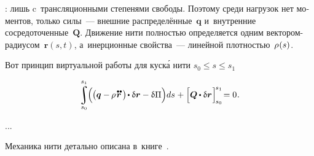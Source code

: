 \begin{otherlanguage}{russian}

 :
   лишь c~трансляционными степенями свободы.
Поэтому среди нагрузок нет моментов, только  силы~--- внешние распределённые~$\bm{q}$ и~внутренние сосредоточенные~$\bm{Q}$.
Движение нити полностью определяется одним вектором-радиусом~${\bm{r}(s,t)}$, а~инерционные свойства~--- линейной плотностью~${\rho\hspace{.12ex}(s)}$.

Вот принцип виртуальной работы для куск\'{а} нити ${s_0 \leq s \leq s_1}$

\nopagebreak\vspace{-0.25em}\begin{equation}
\scalebox{0.95}{$
\displaystyle \integral\displaylimits_{\raisemath{.05em}{\mathclap{s_0}}}^{\raisemath{.15em}{\mathclap{s_1}}}
$}
\hspace{-0.25ex} \Bigl( \hspace{-0.1ex}
\bigl( \bm{q} - \hspace{-0.12ex} \rho \hspace{.2ex} \mathdotdotabove{\bm{r}} \hspace{.36ex} \bigr)
\hspace{-0.25ex} \dotp \variation{\bm{r}}
- \variation{\Pi}
\Bigr) ds
\hspace{.1ex} + \Bigl[
\bm{Q} \hspace{-0.1ex} \dotp \variation{\bm{r}}
\hspace{.12ex} \Bigr]_{\hspace{-0.25ex}s_0}^{\hspace{-0.25ex}s_1}
\hspace{-0.4ex} = 0 \hspace{.1ex} .
\end{equation}

...


Механика нити детально описана в~книге~\cite{merkin-threadmechanics}.

\end{otherlanguage}



